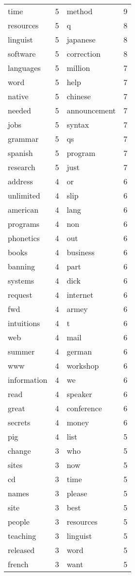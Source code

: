 \documentclass[10pt, a4paper]{article}
\begin{document}
\begin{tabular}{l c l c}
time & 5 & method & 9 \\
resources & 5 & q & 8 \\
linguist & 5 & japanese & 8 \\
software & 5 & correction & 8 \\
languages & 5 & million & 7 \\
word & 5 & help & 7 \\
native & 5 & chinese & 7 \\
needed & 5 & announcement & 7 \\
jobs & 5 & syntax & 7 \\
grammar & 5 & qs & 7 \\
spanish & 5 & program & 7 \\
research & 5 & just & 7 \\
address & 4 & or & 6 \\
unlimited & 4 & slip & 6 \\
american & 4 & lang & 6 \\
programs & 4 & non & 6 \\
phonetics & 4 & out & 6 \\
books & 4 & business & 6 \\
banning & 4 & part & 6 \\
systems & 4 & dick & 6 \\
request & 4 & internet & 6 \\
fwd & 4 & armey & 6 \\
intuitions & 4 & t & 6 \\
web & 4 & mail & 6 \\
summer & 4 & german & 6 \\
www & 4 & workshop & 6 \\
information & 4 & we & 6 \\
read & 4 & speaker & 6 \\
great & 4 & conference & 6 \\
secrets & 4 & money & 6 \\
pig & 4 & list & 5 \\
change & 3 & who & 5 \\
sites & 3 & now & 5 \\
cd & 3 & time & 5 \\
names & 3 & please & 5 \\
site & 3 & best & 5 \\
people & 3 & resources & 5 \\
teaching & 3 & linguist & 5 \\
released & 3 & word & 5 \\
french & 3 & want & 5 \\

\end{tabular}
\end{document}
